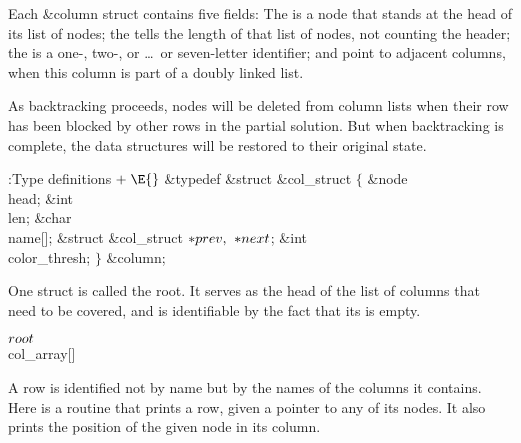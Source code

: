 Each \&{column} struct contains five fields:
The  is a node that stands at the head of its list of nodes;
the  tells the length of that list of nodes, not counting the
header;
the  is a one-, two-, or \dots\ or seven-letter identifier;
 and  point to adjacent columns, when this
column is part of a doubly linked list.

As backtracking proceeds, nodes
will be deleted from column lists when their row has been blocked by
other rows in the partial solution.
But when backtracking is complete, the data structures will be
restored to their original state.

\Y\B\4:Type definitions\X${}\mathrel+\E{}$\6
\&{typedef} \&{struct} \&{col\_struct} ${}\{{}$\1\6
\&{node} \\{head};\6
\&{int} \\{len};\6
\&{char} \\{name}[];\6
\&{struct} \&{col\_struct} ${}{*}\\{prev},{}$ ${}{*}\\{next}{}$;\6
\&{int} \\{color\_thresh};\2\6
${}\}{}$ \&{column};\par
\fi

One  struct is called the root. It serves as the head of
the
list of columns that need to be covered, and is identifiable by the fact
that its  is empty.

\Y\B\4\D$\\{root}$ \5
\\{col\_array}[]\par
\fi

A row is identified not by name but by the names of the columns it
contains.
Here is a routine that prints a row, given a pointer to any of its
nodes. It also prints the position of the given node in its column.


